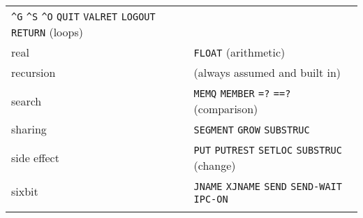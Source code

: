\documentclass[a4paper]{scrbook}
\begin{document}
\begin{longtable}[]{@{}ll@{}}
\begin{minipage}[t]{0.83\columnwidth}
\texttt{\^{}G} \texttt{\^{}S} \texttt{\^{}O} \texttt{QUIT} \texttt{VALRET} \texttt{LOGOUT} \texttt{RETURN} (loops)\strut
\end{minipage}\tabularnewline
\begin{minipage}[t]{0.11\columnwidth}\raggedright\strut
real\strut
\end{minipage} & \begin{minipage}[t]{0.83\columnwidth}\raggedright\strut
\texttt{FLOAT} (arithmetic)\strut
\end{minipage}\tabularnewline
\begin{minipage}[t]{0.11\columnwidth}\raggedright\strut
recursion\strut
\end{minipage} & \begin{minipage}[t]{0.83\columnwidth}\raggedright\strut
(always assumed and built in)\strut
\end{minipage}\tabularnewline
\begin{minipage}[t]{0.11\columnwidth}\raggedright\strut
search\strut
\end{minipage} & \begin{minipage}[t]{0.83\columnwidth}\raggedright\strut
\texttt{MEMQ} \texttt{MEMBER} \texttt{=?} \texttt{==?} (comparison)\strut
\end{minipage}\tabularnewline
\begin{minipage}[t]{0.11\columnwidth}\raggedright\strut
sharing\strut
\end{minipage} & \begin{minipage}[t]{0.83\columnwidth}\raggedright\strut
\texttt{SEGMENT} \texttt{GROW} \texttt{SUBSTRUC}\strut
\end{minipage}\tabularnewline
\begin{minipage}[t]{0.11\columnwidth}\raggedright\strut
side effect\strut
\end{minipage} & \begin{minipage}[t]{0.83\columnwidth}\raggedright\strut
\texttt{PUT} \texttt{PUTREST} \texttt{SETLOC} \texttt{SUBSTRUC} (change)\strut
\end{minipage}\tabularnewline
\begin{minipage}[t]{0.11\columnwidth}\raggedright\strut
sixbit\strut
\end{minipage} & \begin{minipage}[t]{0.83\columnwidth}\raggedright\strut
\texttt{JNAME} \texttt{XJNAME} \texttt{SEND} \texttt{SEND-WAIT} \texttt{IPC-ON}\strut
\end{minipage}\tabularnewline
\begin{minipage}[t]{0.11\columnwidth}\raggedright\strut

\end{minipage}
\end{longtable}
\end{document}
